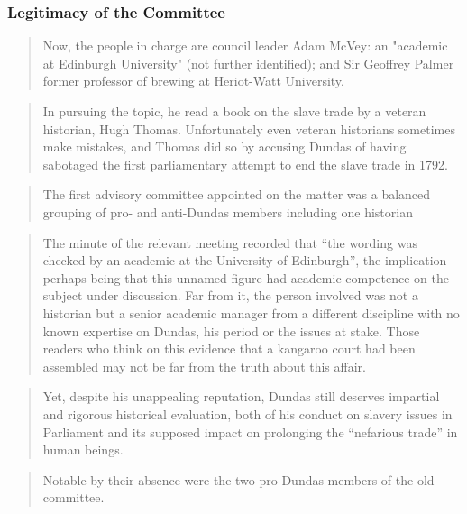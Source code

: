 \subsubsection{Legitimacy of the Committee}

\begin{quotation}
    Now, the people in charge are council leader Adam McVey: an "academic at Edinburgh University" (not further identified); and Sir Geoffrey Palmer former professor of brewing at Heriot-Watt University.
\end{quotation}
\cite{fry_2020}

\begin{quotation}
In pursuing the topic, he read a book on the slave trade by a veteran historian, Hugh Thomas. Unfortunately even veteran historians sometimes make mistakes, and Thomas did so by accusing Dundas of having sabotaged the first parliamentary attempt to end the slave trade in 1792.
\end{quotation}
\cite{fry_2020}

\begin{quotation}
The first advisory committee appointed on the matter was a balanced grouping of pro- and anti-Dundas members including one historian
\end{quotation}
\cite{devine_2020}

\begin{quotation}
The minute of the relevant meeting recorded that “the wording was checked by an academic at the University of Edinburgh”, the implication perhaps being that this unnamed figure had academic competence on the subject under discussion. Far from it, the person involved was not a historian but a senior academic manager from a different discipline with no known expertise on Dundas, his period or the issues at stake. Those readers who think on this evidence that a kangaroo court had been assembled may not be far from the truth about this affair.
\end{quotation}
\cite{devine_2020}

\begin{quotation}
Yet, despite his unappealing reputation, Dundas still deserves impartial and rigorous historical evaluation, both of his conduct on slavery issues in Parliament and its supposed impact on prolonging the “nefarious trade” in human beings.
\end{quotation}
\cite{devine_2020}

\begin{quotation}
 Notable by their absence were the two pro-Dundas members of the old committee.
\end{quotation}
\cite{devine_2020}

